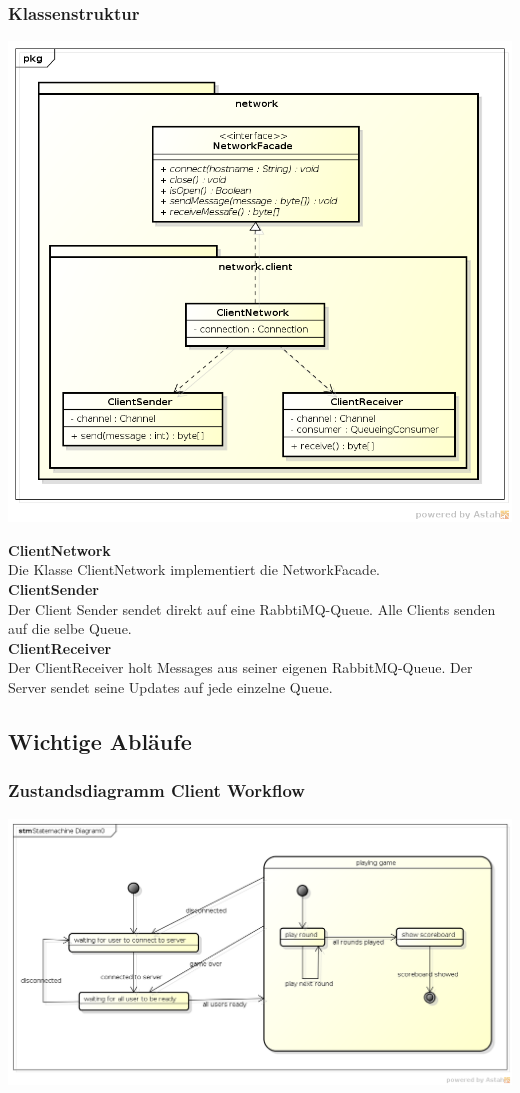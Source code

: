 \documentclass[11pt]{scrartcl}
\begin{document}
\subsubsection{Klassenstruktur}
\includegraphics[scale=0.5]{ClassDiagramNetworkClient}

\textbf{ClientNetwork}\\
Die Klasse ClientNetwork implementiert die NetworkFacade.\\

\textbf{ClientSender}\\
Der Client Sender sendet direkt auf eine RabbtiMQ-Queue. Alle Clients senden auf die selbe Queue.\\

\textbf{ClientReceiver}\\
Der ClientReceiver holt Messages aus seiner eigenen RabbitMQ-Queue. Der Server sendet seine Updates auf jede einzelne Queue.

\newpage

\subsection{Wichtige Abläufe}
\subsubsection{Zustandsdiagramm Client Workflow}
\includegraphics[scale=0.5]{StatemachineClient}
\end{document}
